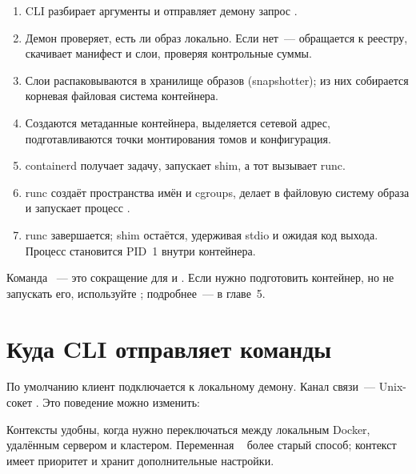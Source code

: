 \begin{enumerate}
  \item CLI разбирает аргументы и отправляет демону запрос
        .
  \item Демон проверяет, есть ли образ  локально.
        Если нет~--- обращается к реестру, скачивает манифест и слои,
        проверяя контрольные суммы.
  \item Слои распаковываются в хранилище образов (snapshotter);
        из них собирается корневая файловая система контейнера.
  \item Создаются метаданные контейнера, выделяется сетевой адрес,
        подготавливаются точки монтирования томов и конфигурация.
  \item containerd получает задачу, запускает shim, а тот вызывает runc.
  \item runc создаёт пространства имён и cgroups, делает 
        в файловую систему образа и запускает процесс .
  \item runc завершается; shim остаётся, удерживая stdio и ожидая
        код выхода. Процесс  становится PID~1 внутри контейнера.
\end{enumerate}

\begin{notebox}
Команда ~--- это сокращение для 
и . Если нужно подготовить контейнер, но не запускать
его, используйте ; подробнее~--- в главе~5.
\end{notebox}

\section{Куда CLI отправляет команды}

По умолчанию клиент подключается к локальному демону.
Канал связи~--- Unix-сокет .
Это поведение можно изменить:


Контексты удобны, когда нужно переключаться между локальным Docker,
удалённым сервером и кластером. Переменная ~
более старый способ; контекст имеет приоритет и хранит дополнительные
настройки.

